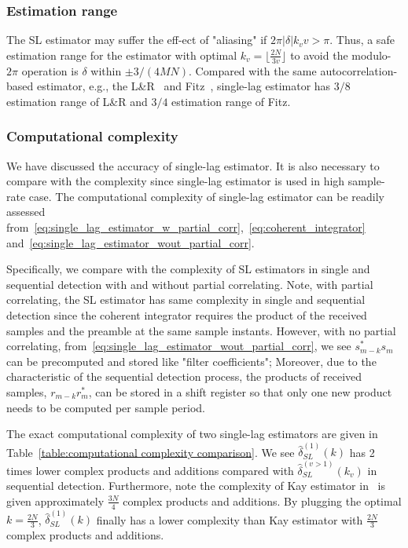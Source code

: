 \subsubsection{Estimation range}
The SL estimator may suffer the eff-ect
of "aliasing" if $2\pi |\delta|k_vv{>}\pi$. Thus, a safe estimation range for the estimator with optimal $k_v=\lfloor\frac{2N}{3v}\rfloor$ to avoid the modulo-$2\pi$ operation
is $\delta$ within $\pm 3/(4MN)$. Compared with the same autocorrelation-based estimator, e.g.,
the L\&R~\cite{Luise_Reggiannini_95} and Fitz~\cite{Fitz_94}, single-lag estimator has 
$3/8$ estimation range of L\&R and $3/4$ estimation range of Fitz.

\subsubsection{Computational complexity}

We have discussed the accuracy of single-lag estimator.
It is also necessary to compare with the complexity since single-lag estimator
is used in high sample-rate case. The computational complexity of single-lag estimator 
can be readily assessed from~\eqref{eq:single_lag_estimator_w_partial_corr},~\eqref{eq:coherent_integrator} and~\eqref{eq:single_lag_estimator_wout_partial_corr}.

Specifically, we compare with the complexity of SL estimators in single and sequential detection with and without partial correlating.
Note, with partial correlating, the SL estimator has same complexity in single and sequential detection since the
coherent integrator requires the product of the received samples and the preamble 
at the same sample instants. However, with no partial correlating, from~\eqref{eq:single_lag_estimator_wout_partial_corr},
we see $s_{m-k}^*s_m$ can be precomputed and stored
like "filter coefficients"; Moreover, due to the characteristic of the sequential detection process, the products of received samples, $r_{m-k}r_m^*$,
can be stored in a shift register so that only one new product needs to be computed per sample period.

The exact computational complexity of two single-lag estimators are given in Table~\ref{table:computational complexity comparison}. 
We see $\hat{\delta}_{SL}^{(1)}(k)$ has 2 times lower complex products and additions compared with $\hat{\delta}_{SL}^{(v>1)}(k_v)$ in sequential detection.
Furthermore, note the complexity of Kay estimator in~\cite{Morelli_Mengali_98} is given approximately $\frac{3N}{4}$ complex products and additions. By plugging
the optimal $k=\frac{2N}{3}$, $\hat{\delta}_{SL}^{(1)}(k)$ finally has a lower complexity than Kay estimator with $\frac{2N}{3}$ complex products and additions.

